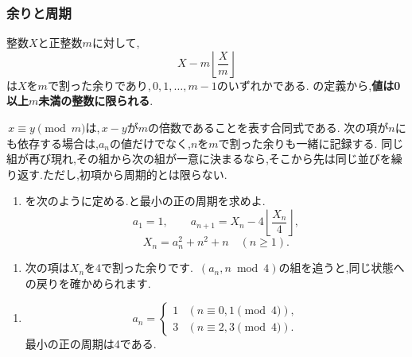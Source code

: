   \subsubsection{余りと周期}\label{節：ガウス型の余りと周期}
    整数$X$と正整数$m$に対して,
    \[
      X-m\left\lfloor\frac Xm\right\rfloor
    \]
    は$X$を$m$で割った余りであり,\,$0,1,\ldots,m-1$のいずれかである.
    の定義から,\textbf{値は0以上$m$未満の整数に限られる}.

    \,$x\equiv y\pmod m$は,\,$x-y$が$m$の倍数であることを表す合同式である.
    次の項が$n$にも依存する場合は,$a_n$の値だけでなく,$n$を$m$で割った余りも一緒に記録する.
    同じ組が再び現れ,その組から次の組が一意に決まるなら,そこから先は同じ並びを繰り返す.ただし,初項から周期的とは限らない.

    \noindent {}\par\nobreak
    \begin{enumerate}[label=(\arabic*),parsep=3pt,beginpenalty=10000,format=\bookitemlink{example-gauss-role-3}{problem}{answer}]
      \item {}を次のように定める.と最小の正の周期を求めよ.
            \[
              a_1=1,\qquad
              a_{n+1}=X_n-4\left\lfloor\frac{X_n}{4}\right\rfloor,
            \]
            \[
              X_n=a_n^2+n^2+n\quad(n\ge1).
            \]
    \end{enumerate}

    \noindent {}\par\nobreak
    \begin{enumerate}[label=(\arabic*),parsep=3pt,beginpenalty=10000,format=\bookitemlink{example-gauss-role-3}{hint}{problem}]
      \item 次の項は$X_n$を4で割った余りです.
            \,$(a_n,n\bmod4)$の組を追うと,同じ状態への戻りを確かめられます.
    \end{enumerate}

    \noindent {}\par\nobreak
    \begin{enumerate}[label=(\arabic*),parsep=3pt,beginpenalty=10000,format=\bookitemlink{example-gauss-role-3}{answer}{problem}]
      \item \[
              a_n=
              \begin{cases}
                1 & (n\equiv0,1\pmod4),\\
                3 & (n\equiv2,3\pmod4).
              \end{cases}
            \]
            最小の正の周期は4である.
    \end{enumerate}

